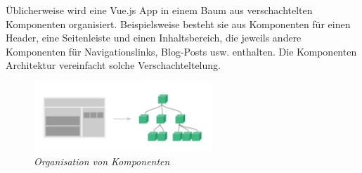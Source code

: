 Üblicherweise wird eine Vue.js App in einem Baum aus verschachtelten Komponenten organisiert. Beispielsweise besteht sie aus Komponenten für einen Header, eine Seitenleiste und einen Inhaltsbereich, die jeweils andere Komponenten für Navigationslinks, Blog-Posts usw. enthalten. Die Komponenten Architektur vereinfacht solche Verschachteltelung.
\begin{figure}[H]
  \centering
  \includegraphics[width=0.6\textwidth]{Bilder/img/components.png}  
  \caption{ \textit{Organisation von Komponenten} \cite{VueComponents:Online}}%
\label{fig:Organisation von Komponenten}
\end{figure}


